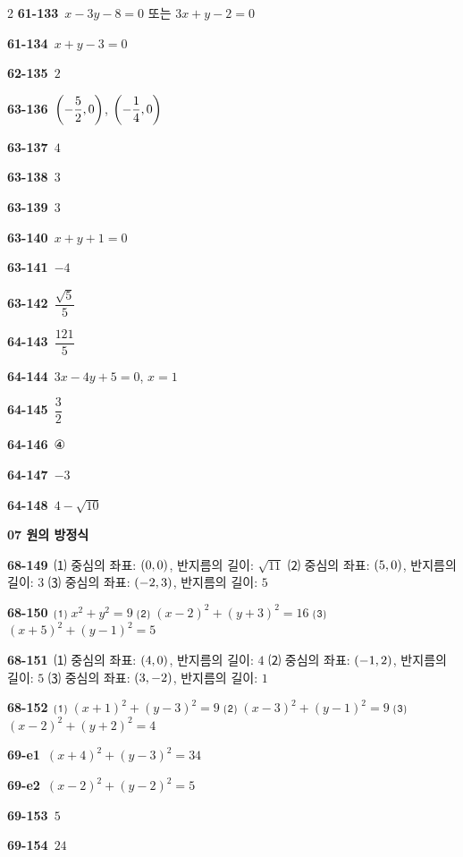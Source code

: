 \documentclass[10pt,a4paper]{article}
\begin{document}
\begin{multicols}{2}
\noindent\textbf{61-133}\ $x-3y-8=0$ 또는 $3x+y-2=0$\par
\noindent\textbf{61-134}\ $x+y-3=0$\par
\noindent\textbf{62-135}\ $2$\par
\noindent\textbf{63-136}\ $\left(-\dfrac{5}{2}{,}\mkern3mu\mathopen{}0\right)$, $\left(-\dfrac{1}{4}{,}\mkern3mu\mathopen{}0\right)$\par
\noindent\textbf{63-137}\ $4$\par
\noindent\textbf{63-138}\ $3$\par
\noindent\textbf{63-139}\ $3$\par
\noindent\textbf{63-140}\ $x+y+1=0$\par
\noindent\textbf{63-141}\ $-4$\par
\noindent\textbf{63-142}\ $\dfrac{\sqrt{5}}{5}$\par
\noindent\textbf{64-143}\ $\dfrac{121}{5}$\par
\noindent\textbf{64-144}\ $3x-4y+5=0$, $x=1$\par
\noindent\textbf{64-145}\ $\dfrac{3}{2}$\par
\noindent\textbf{64-146}\ ④\par
\noindent\textbf{64-147}\ $-3$\par
\noindent\textbf{64-148}\ $4-\sqrt{10}$\par
\noindent\textbf{07 원의 방정식}\par\smallskip
\noindent\textbf{68-149}\ ⑴ 중심의 좌표: $(0{,}\mkern3mu\mathopen{}0)$, 반지름의 길이: $\sqrt{11}$ ⑵ 중심의 좌표: $(5{,}\mkern3mu\mathopen{}0)$, 반지름의 길이: $3$ ⑶ 중심의 좌표: $(-2{,}\mkern3mu\mathopen{}3)$, 반지름의 길이: $5$\par
\noindent\textbf{68-150}\ ⑴ $x^2+y^2=9$ ⑵ $(x-2)^2+(y+3)^2=16$ ⑶ $(x+5)^2+(y-1)^2=5$\par
\noindent\textbf{68-151}\ ⑴ 중심의 좌표: $(4{,}\mkern3mu\mathopen{}0)$, 반지름의 길이: $4$ ⑵ 중심의 좌표: $(-1{,}\mkern3mu\mathopen{}2)$, 반지름의 길이: $5$ ⑶ 중심의 좌표: $(3{,}\mkern3mu\mathopen{}-2)$, 반지름의 길이: $1$\par
\noindent\textbf{68-152}\ ⑴ $(x+1)^2+(y-3)^2=9$ ⑵ $(x-3)^2+(y-1)^2=9$ ⑶ $(x-2)^2+(y+2)^2=4$\par
\noindent\textbf{69-e1}\ $(x+4)^2+(y-3)^2=34$\par
\noindent\textbf{69-e2}\ $(x-2)^2+(y-2)^2=5$\par
\noindent\textbf{69-153}\ $5$\par
\noindent\textbf{69-154}\ $24$\par

\end{multicols}
\end{document}
